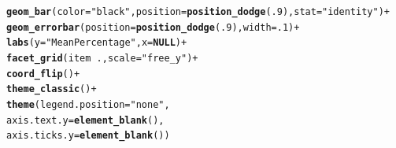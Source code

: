 \documentclass{article}\usepackage[]{graphicx}\usepackage[]{color}
\makeatletter
\newcommand{\hlnum}[1]{\textcolor[rgb]{0.686,0.059,0.569}{#1}}%
\newcommand{\hlstr}[1]{\textcolor[rgb]{0.192,0.494,0.8}{#1}}%
\newcommand{\hlopt}[1]{\textcolor[rgb]{0,0,0}{#1}}%
\newcommand{\hlstd}[1]{\textcolor[rgb]{0.345,0.345,0.345}{#1}}%
\newcommand{\hlkwa}[1]{\textcolor[rgb]{0.161,0.373,0.58}{\textbf{#1}}}%
\newcommand{\hlkwc}[1]{\textcolor[rgb]{0.333,0.667,0.333}{#1}}%
\newcommand{\hlkwd}[1]{\textcolor[rgb]{0.737,0.353,0.396}{\textbf{#1}}}%
\newenvironment{kframe}{%
 \def\at@end@of@kframe{}%
 \ifinner\ifhmode%
  \def\at@end@of@kframe{\end{minipage}}%
  \begin{minipage}{\columnwidth}%
 \fi\fi%
 \def\FrameCommand##1{\hskip\@totalleftmargin \hskip-\fboxsep
 \colorbox{shadecolor}{##1}\hskip-\fboxsep
     \hskip-\linewidth \hskip-\@totalleftmargin \hskip\columnwidth}%
 \MakeFramed {\advance\hsize-\width
   \@totalleftmargin\z@ \linewidth\hsize
   \@setminipage}}%
 {\par\unskip\endMakeFramed%
 \at@end@of@kframe}
\newenvironment{knitrout}{}{} %
\makeatother
\begin{document}
\begin{knitrout}
\begin{kframe}
\begin{alltt}
    \hlkwd{geom_bar}\hlstd{(}\hlkwc{color} \hlstd{=} \hlstr{"black"}\hlstd{,} \hlkwc{position} \hlstd{=} \hlkwd{position_dodge}\hlstd{(}\hlnum{.9}\hlstd{),} \hlkwc{stat} \hlstd{=} \hlstr{"identity"}\hlstd{)} \hlopt{+}
    \hlkwd{geom_errorbar}\hlstd{(}\hlkwc{position} \hlstd{=} \hlkwd{position_dodge}\hlstd{(}\hlnum{.9}\hlstd{),} \hlkwc{width} \hlstd{=} \hlnum{.1}\hlstd{)} \hlopt{+}
    \hlkwd{labs}\hlstd{(}\hlkwc{y} \hlstd{=} \hlstr{"Mean Percentage"}\hlstd{,} \hlkwc{x} \hlstd{=} \hlkwa{NULL}\hlstd{)} \hlopt{+}
    \hlkwd{facet_grid}\hlstd{(item}\hlopt{~}\hlstd{.,} \hlkwc{scale} \hlstd{=} \hlstr{"free_y"}\hlstd{)} \hlopt{+}
    \hlkwd{coord_flip}\hlstd{()} \hlopt{+}
    \hlkwd{theme_classic}\hlstd{()} \hlopt{+}
    \hlkwd{theme}\hlstd{(}\hlkwc{legend.position} \hlstd{=} \hlstr{"none"}\hlstd{,}
          \hlkwc{axis.text.y} \hlstd{=} \hlkwd{element_blank}\hlstd{(),}
          \hlkwc{axis.ticks.y} \hlstd{=} \hlkwd{element_blank}\hlstd{())}
\end{alltt}
\end{kframe}

\end{knitrout}
\end{document}
